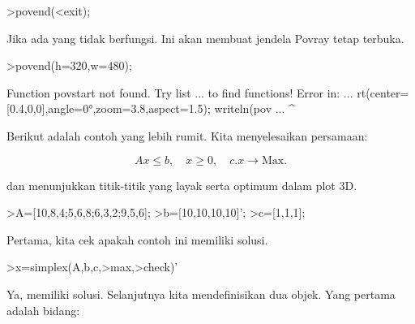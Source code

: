 \documentclass[a4paper,10pt]{article}
\begin{document}
\begin{eulernotebook}
\begin{eulercomment}
\begin{eulercomment}
\begin{eulercomment}
\end{eulercomment}
\begin{eulerttcomment}
 >povend(<exit);
\end{eulerttcomment}
\begin{eulercomment}

Jika ada yang tidak berfungsi. Ini akan membuat jendela Povray tetap
terbuka.
\end{eulercomment}
\begin{eulerprompt}
>povend(h=320,w=480);
\end{eulerprompt}
\begin{euleroutput}
  Function povstart not found.
  Try list ... to find functions!
  Error in:
  ... rt(center=[0.4,0,0],angle=0°,zoom=3.8,aspect=1.5); writeln(pov ...
                                                       ^
\end{euleroutput}
\begin{eulercomment}
Berikut adalah contoh yang lebih rumit. Kita menyelesaikan persamaan:

\end{eulercomment}
\begin{eulerformula}
\[
Ax \le b, \quad x \ge 0, \quad c.x \to \text{Max.}
\]
\end{eulerformula}
\begin{eulercomment}
dan menunjukkan titik-titik yang layak serta optimum dalam plot 3D.
\end{eulercomment}
\begin{eulerprompt}
>A=[10,8,4;5,6,8;6,3,2;9,5,6];
>b=[10,10,10,10]';
>c=[1,1,1];
\end{eulerprompt}
\begin{eulercomment}
Pertama, kita cek apakah contoh ini memiliki solusi.
\end{eulercomment}
\begin{eulerprompt}
>x=simplex(A,b,c,>max,>check)'
\end{eulerprompt}
\begin{euleroutput}
  [0,  1,  0.5]
\end{euleroutput}
\begin{eulercomment}
Ya, memiliki solusi. Selanjutnya kita mendefinisikan dua objek. Yang
pertama adalah bidang:


\end{eulercomment}
\end{eulercomment}
\end{eulercomment}
\end{eulernotebook}
\end{document}
